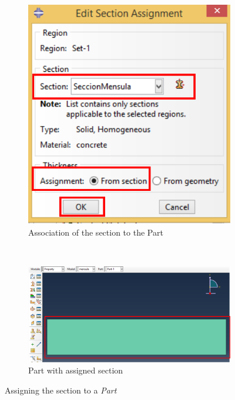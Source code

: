 \begin{enumerate}
\begin{figure}[H]
\begin{subfigure}{0.29\textwidth}
      \includegraphics[width=\textwidth]{./body/images/imagen19.pdf}
      \caption{Association of the section to the Part}
      \label{figu19}
    \end{subfigure}%
    ~ %
    \begin{subfigure}{0.49\textwidth}
      \includegraphics[width=\textwidth]{./body/images/imagen20.pdf}
      \caption{Part with assigned section}
       \label{figu20}
    \end{subfigure}
    \caption{Assigning the section to a \textit{Part}}
  \end{figure}
\end{enumerate}
\newpage
